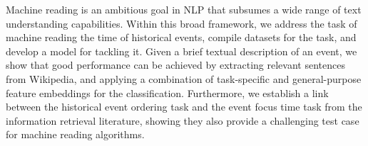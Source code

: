 Machine reading is an ambitious goal in NLP that subsumes a wide range of text understanding capabilities. Within this broad framework, we address the task of machine reading the time of historical events, compile datasets for the task, and develop a model for tackling it. Given a brief textual description of an event, we show that good performance can be achieved by extracting relevant sentences from Wikipedia, and applying a combination of task-specific and general-purpose feature embeddings for the classification. Furthermore, we establish a link between the historical event ordering task and the event focus time task from the information retrieval literature, showing they also provide a challenging test case for machine reading algorithms.
